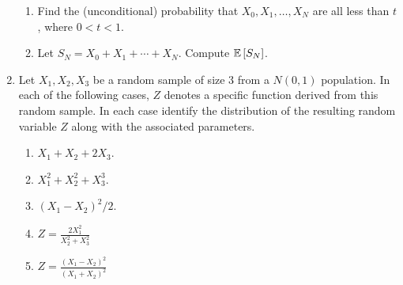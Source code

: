 \documentclass[titlepage]{article}
\begin{document}
\begin{enumerate}
\begin{enumerate}
  \item Find the (unconditional) probability that $X_0, X_1, \ldots, X_N$ are all less than $t$, where $0 < t < 1$.

  \item Let $S_N = X_0 + X_1 + \cdots + X_N$. Compute $\mathbb{E}\left[ S_N \right]$.
  \end{enumerate}

\item Let $X_1, X_2, X_3$ be a random sample of size 3 from a $N(0, 1)$ population. In each of the following cases, $Z$ denotes a specific function derived from this random sample. In each case identify the distribution of the resulting random variable $Z$ along with the associated parameters.
  \begin{enumerate}
  \item $X_1 + X_2 + 2X_3$.

  \item $X_1^2 + X_2^2 + X_3^3$.

  \item $(X_1 - X_2)^2 / 2$.

  \item $Z = \frac{2X_1^2}{X_2^2 + X_3^2}$

  \item $Z = \frac{(X_1 - X_2)^2}{(X_1 + X_2)^2}$
  \end{enumerate}
\end{enumerate}
\end{document}
